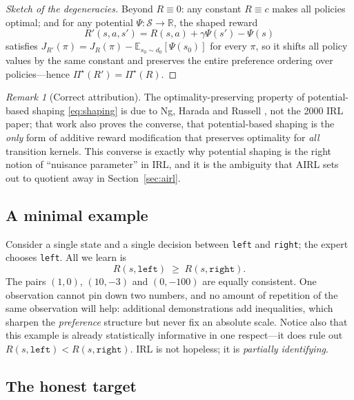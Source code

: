 \documentclass[11pt]{article}
\theoremstyle{plain}
\theoremstyle{definition}
\theoremstyle{remark}
\newtheorem{remark}[theorem]{Remark}
\renewcommand{\S}{\mathcal{S}}
\newcommand{\E}{\mathbb{E}}
\newcommand{\R}{\mathbb{R}}
\begin{document}
\begin{proof}[Sketch of the degeneracies]
Beyond $R\equiv0$: any constant $R\equiv c$ makes all policies optimal;
and for any potential $\Psi:\S\to\R$, the shaped reward
\begin{equation}
R'(s,a,s') = R(s,a) + \gamma\Psi(s') - \Psi(s)
\label{eq:shaping}
\end{equation}
satisfies $J_{R'}(\pi) = J_R(\pi) - \E_{s_0\sim d_0}[\Psi(s_0)]$ for every
$\pi$, so it shifts all policy values by the same constant and preserves
the entire preference ordering over policies---hence $\Pi^\star(R') =
\Pi^\star(R)$.
\end{proof}

\begin{remark}[Correct attribution]
The optimality-preserving property of potential-based shaping
\eqref{eq:shaping} is due to Ng, Harada and Russell \cite{ngharada1999},
not the 2000 IRL paper; that work also proves the converse, that
potential-based shaping is the \emph{only} form of additive reward
modification that preserves optimality for \emph{all} transition kernels.
This converse is exactly why potential shaping is the right notion of
``nuisance parameter'' in IRL, and it is the ambiguity that AIRL sets out
to quotient away in Section~\ref{sec:airl}.
\end{remark}

\subsection{A minimal example}

Consider a single state and a single decision between \texttt{left} and
\texttt{right}; the expert chooses \texttt{left}. All we learn is
\begin{equation}
R(s,\texttt{left}) \;\ge\; R(s,\texttt{right}).
\label{eq:minimal}
\end{equation}
The pairs $(1,0)$, $(10,-3)$ and $(0,-100)$ are equally consistent. One
observation cannot pin down two numbers, and no amount of repetition of
the same observation will help: additional demonstrations add
inequalities, which sharpen the \emph{preference} structure but never fix
an absolute scale. Notice also that this example is already statistically
informative in one respect---it does rule out $R(s,\texttt{left}) <
R(s,\texttt{right})$. IRL is not hopeless; it is \emph{partially
identifying}.

\subsection{The honest target}
\end{document}

